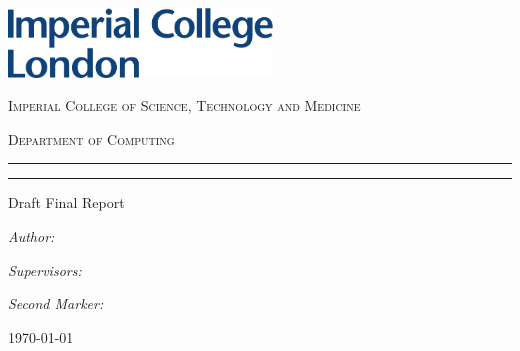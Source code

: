 \begin{titlepage}
	
	\noindent\includegraphics[width=7cm]{./figures/imperial_logo}
	
	\Large\centering
	
	\vspace*{3\baselineskip}	
	\textsc{\LARGE \reporttype}
	
	\vspace*{\baselineskip}	
	\textsc{Imperial College of Science, Technology and Medicine}

	\vspace*{\baselineskip}	
	\textsc{Department of Computing}


	\setlength{\parindent}{0pt}
	
	\setlength{\parskip}{0pt}

	\rule{\linewidth}{0.4pt}\vspace*{\baselineskip}

	{\huge\bfseries\reporttitle}
	\rule{\linewidth}{0.4pt}

	Draft Final Report

	\begin{multicols}{2}
		\begin{flushleft}
			\emph{Author:}
			
			\reportauthor
		\end{flushleft}
		\columnbreak
		\begin{flushright}
			\emph{Supervisors:}
			
			\supervisor	
			\linespace
			\emph{Second Marker:}
			
			\marker
		\end{flushright}			
	\end{multicols}
	
	
	\monthyeardate\today
	
	
\end{titlepage}
